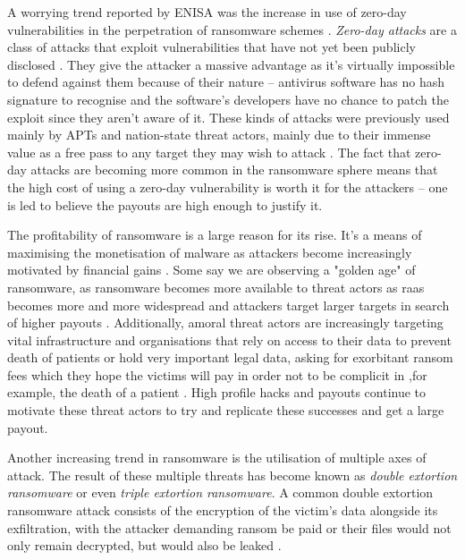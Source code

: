 A worrying trend reported by \acrshort{ENISA} was the increase in use of zero-day vulnerabilities in the
perpetration of ransomware schemes \cite{enisa_threat_landscape}. \emph{Zero-day attacks} are a class of
attacks that exploit vulnerabilities that have not yet been publicly disclosed \cite{zero-day}. They give the 
attacker a massive advantage as it's virtually impossible to defend against them because of their nature -- 
antivirus software has no hash signature to recognise and the software's developers have no chance to patch the
exploit since they aren't aware of it. These kinds of attacks were previously used mainly by \acrfull{APTs} 
and nation-state threat actors, mainly due to their immense value as a free pass to
any target they may wish to attack \cite{enisa_threat_landscape}. The fact that zero-day attacks are becoming more
common in the ransomware sphere means that the high cost of using a zero-day vulnerability is worth it for the 
attackers -- one is led to believe the payouts are high enough to justify it. 

The profitability of ransomware is a large reason for its rise. It's a means of maximising the monetisation of 
malware as attackers become increasingly motivated by financial gains \cite{ransomware-comprehensive, enisa_threat_landscape}.
Some say we are observing a "golden age" of ransomware, as ransomware becomes more available to threat actors
as \acrfull{raas} becomes more and more widespread and attackers target larger targets in search
of higher payouts \cite{enisa_threat_landscape}. Additionally, amoral threat actors are increasingly targeting
vital infrastructure and organisations that rely on access to their data to prevent death of patients
or hold very important legal data, asking for exorbitant ransom fees which they hope the victims will pay in order
not to be complicit in ,for example, the death of a patient \cite[p.~17-18]{morphisec_threat_landscape,
ransomware-book}. %
High profile hacks and payouts continue to motivate these threat actors to try and replicate these successes and 
get a large payout. 

Another increasing trend in ransomware is the utilisation of multiple axes of attack. The result of these multiple
threats has become known as \emph{double extortion ransomware} or even \emph{triple extortion ransomware}. A common
double extortion ransomware attack consists of the encryption of the victim's data alongside its exfiltration,
with the attacker demanding ransom be paid or their files would not only remain decrypted, but would also be leaked
\cite{enisa_threat_landscape, unit42-ransomware}.

